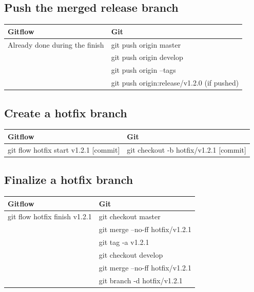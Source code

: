 \documentclass{tufte-handout}
\begin{document}
		\subsection{Push the merged release branch}
		
		\begin{table}[ht]
			\centering
			\selectfont
			\begin{tabular}{ll}
				\toprule
				Gitflow & Git \\
				\midrule
				Already done during the finish & git push origin master \\
				& git push origin develop \\
				& git push origin --tags \\
				& git push origin:release/v1.2.0 (if pushed) \\
				\bottomrule
			\end{tabular}
			\label{tab:normaltab}
		\end{table}
		\medskip %
		
		\clearpage
		
		\subsection{Create a hotfix branch}
		
		\begin{table}[ht]
			\centering
			\selectfont
			\begin{tabular}{ll}
				\toprule
				Gitflow & Git \\
				\midrule
				git flow hotfix start v1.2.1 {[}commit{]} & git checkout -b hotfix/v1.2.1 {[}commit{]} \\
				\bottomrule
			\end{tabular}
			\label{tab:normaltab}
		\end{table}
		\medskip %
		
		
		\subsection{Finalize a hotfix branch}
	
		
		\begin{table}[ht]
			\centering
			\selectfont
			\begin{tabular}{ll}
				\toprule
				Gitflow & Git \\
				\midrule
				git flow hotfix finish v1.2.1 & git checkout master \\
				& git merge --no-ff hotfix/v1.2.1 \\
				& git tag -a v1.2.1 \\
				& git checkout develop \\
				& git merge --no-ff hotfix/v1.2.1 \\
				& git branch -d hotfix/v1.2.1 \\
				\bottomrule
			\end{tabular}
			\label{tab:normaltab}
		\end{table}
		\medskip %
		
\end{document}
